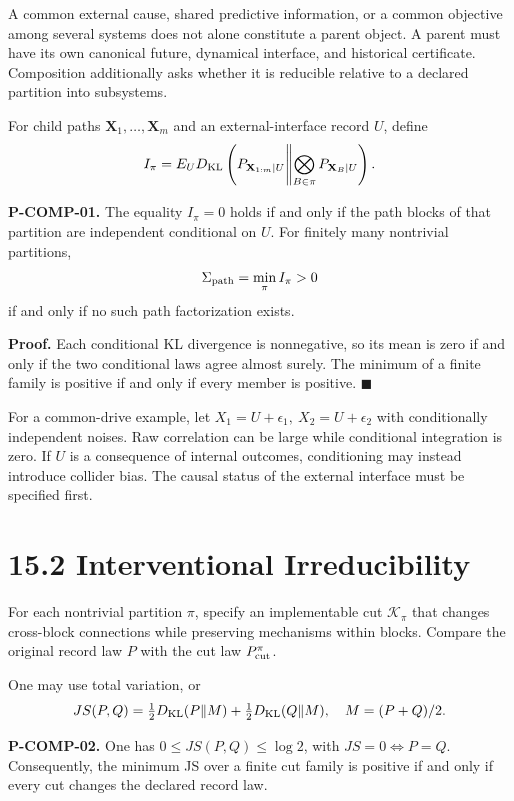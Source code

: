 \documentclass[
  english,
  11pt,
  oneside]{book}
\begin{document}
A common external cause, shared predictive information, or a common objective among several systems does not alone constitute a parent object. A parent must have its own canonical future, dynamical interface, and historical certificate. Composition additionally asks whether it is reducible relative to a declared partition into subsystems.

For child paths \(\mathbf X_1,\ldots,\mathbf X_m\) and an external-interface record \(U\), define \[I_\pi=
E_U D_{\rm KL}\left(P_{\mathbf X_{1:m}\mid U}
\middle\|\bigotimes_{B\in\pi}P_{\mathbf X_B\mid U}\right).\]

\hypertarget{p-comp-01}{}\label{p-comp-01}

\textbf{P-COMP-01.} The equality \(I_\pi=0\) holds if and only if the path blocks of that partition are independent conditional on \(U\). For finitely many nontrivial partitions, \[\Sigma_{\rm path}=\min_\pi I_\pi>0\] if and only if no such path factorization exists.

\textbf{Proof.} Each conditional KL divergence is nonnegative, so its mean is zero if and only if the two conditional laws agree almost surely. The minimum of a finite family is positive if and only if every member is positive. \(\blacksquare\)

For a common-drive example, let \(X_1=U+\epsilon_1,\ X_2=U+\epsilon_2\) with conditionally independent noises. Raw correlation can be large while conditional integration is zero. If \(U\) is a consequence of internal outcomes, conditioning may instead introduce collider bias. The causal status of the external interface must be specified first.

\section{15.2 Interventional Irreducibility}\label{interventional-irreducibility}

For each nontrivial partition \(\pi\), specify an implementable cut \(\mathcal K_\pi\) that changes cross-block connections while preserving mechanisms within blocks. Compare the original record law \(P\) with the cut law \(P^\pi_{\rm cut}\).

One may use total variation, or \[JS(P,Q)=\tfrac12D_{\rm KL}(P\|M)+\tfrac12D_{\rm KL}(Q\|M),
\quad M=(P+Q)/2.\]

\hypertarget{p-comp-02}{}\label{p-comp-02}

\textbf{P-COMP-02.} One has \(0\le JS(P,Q)\le\log2\), with \(JS=0\iff P=Q\). Consequently, the minimum JS over a finite cut family is positive if and only if every cut changes the declared record law.
\end{document}
